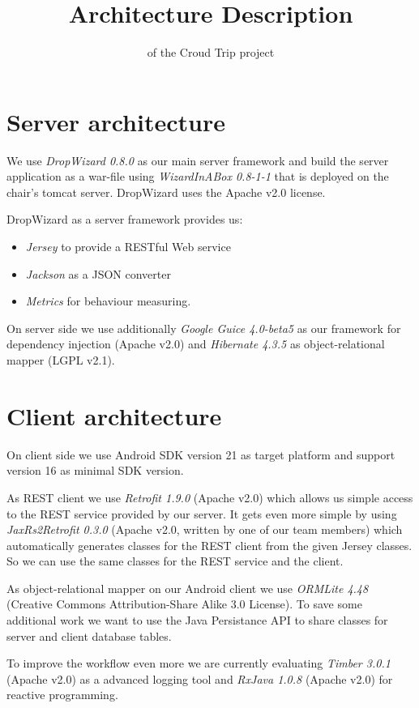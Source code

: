 \documentclass[ngerman, 11pt, a4paper]{scrartcl}
\title{ Architecture Description\huge \vspace{1pt} }
\author{ of the Croud Trip project\\ }
\makeatletter
\def\printtitle{ {\color{bl} \centering \huge \sc \textbf{\@title}\par}}
\def\printauthor{{\color{bl} \centering \small \@author}}
\makeatother
\begin{document}
\clearpage
\printtitle
\printauthor 

\section{Server architecture}
We use \emph{DropWizard 0.8.0} \cite{DropWizard} as our main server framework and build the server application as a war-file using \emph{WizardInABox 0.8-1-1} \cite{WizardInABox}  that is deployed on the chair's tomcat server. DropWizard uses the Apache v2.0 license.

DropWizard as a server framework provides us:
\begin{itemize}
\item \emph{Jersey} to provide a RESTful Web service
\item \emph{Jackson} as a JSON converter
\item \emph{Metrics} for behaviour measuring.
\end{itemize} 
On server side we use additionally \emph{Google Guice 4.0-beta5} \cite{GGuice} as our framework for dependency injection (Apache v2.0) and \emph{Hibernate 4.3.5} \cite{Hibernate} as object-relational mapper (LGPL v2.1).

\section{Client architecture}
On client side we use Android SDK version 21 as target platform and support version 16 as minimal SDK version.

As REST client we use \emph{Retrofit 1.9.0} \cite{Retrofit} (Apache v2.0) which allows us simple access to the REST service provided by our server. It gets even more simple by using \emph{JaxRs2Retrofit 0.3.0} \cite{JRR} (Apache v2.0, written by one of our team members) which automatically generates classes for the REST client from the given Jersey classes. So we can use the same classes for the REST service and the client.

As object-relational mapper on our Android client we use \emph{ORMLite 4.48} \cite{ORMLite} (Creative Commons Attribution-Share Alike 3.0 License). To save some additional work we want to use the Java Persistance API to share classes for server and client database tables.

To improve the workflow even more we are currently evaluating \emph{Timber 3.0.1} \cite{Timber} (Apache v2.0) as a advanced logging tool and \emph{RxJava 1.0.8} \cite{RxJava} (Apache v2.0) for reactive programming.
\end{document}

